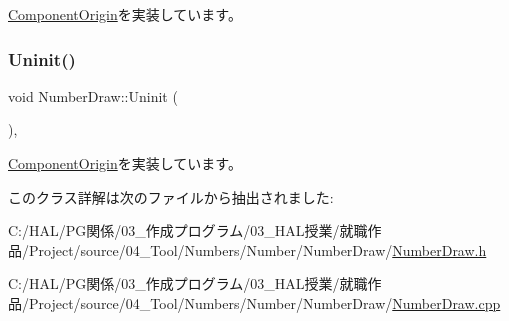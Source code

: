 \mbox{\hyperlink{class_component_origin_a9f674891257f2272b1636d8b6bb05d81}{Component\+Origin}}を実装しています。

\mbox{\label{class_number_draw_a2b203d101f23f0d3f584937ff5ad662a}} 
\subsubsection{\texorpdfstring{Uninit()}{Uninit()}}
{\footnotesize\ttfamily void Number\+Draw\+::\+Uninit (\begin{DoxyParamCaption}{ }\end{DoxyParamCaption})\hspace{0.3cm}{\ttfamily [override]}, {\ttfamily [virtual]}}



\mbox{\hyperlink{class_component_origin_a9f89a93f9c1954bd53f9750e35e6089d}{Component\+Origin}}を実装しています。



このクラス詳解は次のファイルから抽出されました\+:\begin{DoxyCompactItemize}
\item 
C\+:/\+H\+A\+L/\+P\+G関係/03\+\_\+作成プログラム/03\+\_\+\+H\+A\+L授業/就職作品/\+Project/source/04\+\_\+\+Tool/\+Numbers/\+Number/\+Number\+Draw/\mbox{\hyperlink{_number_draw_8h}{Number\+Draw.\+h}}\item 
C\+:/\+H\+A\+L/\+P\+G関係/03\+\_\+作成プログラム/03\+\_\+\+H\+A\+L授業/就職作品/\+Project/source/04\+\_\+\+Tool/\+Numbers/\+Number/\+Number\+Draw/\mbox{\hyperlink{_number_draw_8cpp}{Number\+Draw.\+cpp}}\end{DoxyCompactItemize}
